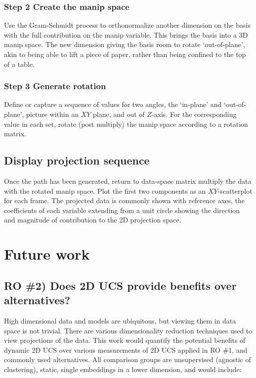 \documentclass{monashthesis}
\begin{document}
\subsection{Step 2 Create the manip
space}\label{step-2-create-the-manip-space}

Use the Gram-Schmidt process to orthonormalize another dimension on the
basis with the full contribution on the manip variable. This brings the
basis into a 3D manip space. The new dimension giving the basis room to
rotate `out-of-plane', akin to being able to lift a piece of paper,
rather than being confined to the top of a table.

\subsection{Step 3 Generate rotation}\label{step-3-generate-rotation}

Define or capture a sequence of values for two angles, the `in-plane'
and `out-of-plane', picture within an \(XY\) plane, and out of
\(Z\)-axis. For the corresponding value in each set, rotate (post
multiply) the manip space according to a rotation matrix.

\section{Display projection sequence}\label{display-projection-sequence}

Once the path has been generated, return to data-space matrix multiply
the data with the rotated manip space. Plot the first two components as
an \(XY\)-scatterplot for each frame. The projected data is commonly
shown with reference axes, the coefficients of each variable extending
from a unit circle showing the direction and magnitude of contribution
to the 2D projection space.

\chapter{Future work}\label{ch:future_work}

\section{RO \#2) Does 2D UCS provide benefits over
alternatives?}\label{ro-2-does-2d-ucs-provide-benefits-over-alternatives}

High dimensional data and models are ubiquitous, but viewing them in
data space is not trivial. There are various dimensionality reduction
techniques used to view projections of the data. This work would
quantify the potential benefits of dynamic 2D UCS over various
measurements of 2D UCS applied in RO \#1, and commonly used
alternatives. All comparison groups are unsupervised (agnostic of
clustering), static, single embeddings in a lower dimension, and would
include:
\end{document}
